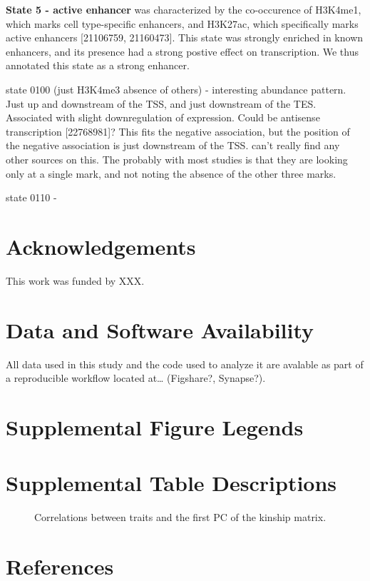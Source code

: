 \documentclass[10pt,letterpaper]{article}
\begin{document}
\textbf{State 5 - active enhancer} was characterized by the co-occurence
of H3K4me1, which marks cell type-specific enhancers, and H3K27ac, which
specifically marks active enhancers {[}21106759, 21160473{]}. This state
was strongly enriched in known enhancers, and its presence had a strong
postive effect on transcription. We thus annotated this state as a
strong enhancer.

state 0100 (just H3K4me3 absence of others) - interesting abundance
pattern. Just up and downstream of the TSS, and just downstream of the
TES. Associated with slight downregulation of expression. Could be
antisense transcription {[}22768981{]}? This fits the negative
association, but the position of the negative association is just
downstream of the TSS. can't really find any other sources on this. The
probably with most studies is that they are looking only at a single
mark, and not noting the absence of the other three marks.

state 0110 -

\hypertarget{acknowledgements}{%
\section{Acknowledgements}\label{acknowledgements}}

This work was funded by XXX.

\hypertarget{data-and-software-availability}{%
\section{Data and Software
Availability}\label{data-and-software-availability}}

All data used in this study and the code used to analyze it are avalable
as part of a reproducible workflow located at\ldots{} (Figshare?,
Synapse?).

\hypertarget{supplemental-figure-legends}{%
\section{Supplemental Figure
Legends}\label{supplemental-figure-legends}}

\begin{figure}[ht]
\centering
\caption{
}
\label{fig:trait_cor}
\end{figure}

\hypertarget{supplemental-table-descriptions}{%
\section{Supplemental Table
Descriptions}\label{supplemental-table-descriptions}}

\begin{figure}[ht]
\centering
\caption{Correlations between traits and the first PC of the kinship matrix.
}
\label{table:trait_cor}
\end{figure}

\hypertarget{references}{%
\section*{References}\label{references}}

\nolinenumbers
\end{document}
